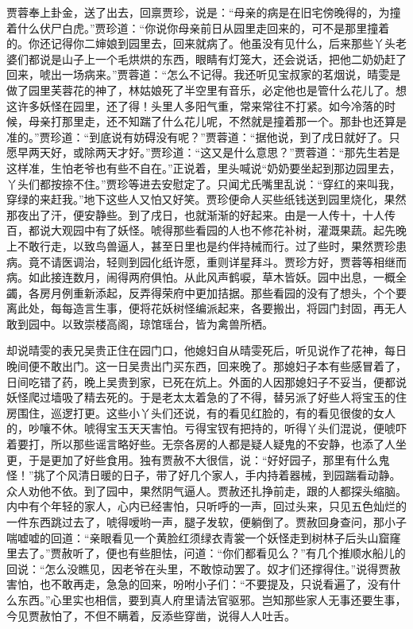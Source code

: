 \begin{parag}
    贾蓉奉上卦金，送了出去，回禀贾珍，说是：“母亲的病是在旧宅傍晚得的，为撞着什么伏尸白虎。”贾珍道：“你说你母亲前日从园里走回来的，可不是那里撞着的。你还记得你二婶娘到园里去，回来就病了。他虽没有见什么，后来那些丫头老婆们都说是山子上一个毛烘烘的东西，眼睛有灯笼大，还会说话，把他二奶奶赶了回来，唬出一场病来。”贾蓉道：“怎么不记得。我还听见宝叔家的茗烟说，晴雯是做了园里芙蓉花的神了，林姑娘死了半空里有音乐，必定他也是管什么花儿了。想这许多妖怪在园里，还了得！头里人多阳气重，常来常往不打紧。如今冷落的时候，母亲打那里走，还不知踹了什么花儿呢，不然就是撞着那一个。那卦也还算是准的。”贾珍道：“到底说有妨碍没有呢？”贾蓉道：“据他说，到了戌日就好了。只愿早两天好，或除两天才好。”贾珍道：“这又是什么意思？”贾蓉道：“那先生若是这样准，生怕老爷也有些不自在。”正说着，里头喊说“奶奶要坐起到那边园里去，丫头们都按捺不住。”贾珍等进去安慰定了。只闻尤氏嘴里乱说：“穿红的来叫我，穿绿的来赶我。”地下这些人又怕又好笑。贾珍便命人买些纸钱送到园里烧化，果然那夜出了汗，便安静些。到了戌日，也就渐渐的好起来。由是一人传十，十人传百，都说大观园中有了妖怪。唬得那些看园的人也不修花补树，灌溉果蔬。起先晚上不敢行走，以致鸟兽逼人，甚至日里也是约伴持械而行。过了些时，果然贾珍患病。竟不请医调治，轻则到园化纸许愿，重则详星拜斗。贾珍方好，贾蓉等相继而病。如此接连数月，闹得两府俱怕。从此风声鹤唳，草木皆妖。园中出息，一概全蠲，各房月例重新添起，反弄得荣府中更加拮据。那些看园的没有了想头，个个要离此处，每每造言生事，便将花妖树怪编派起来，各要搬出，将园门封固，再无人敢到园中。以致崇楼高阁，琼馆瑶台，皆为禽兽所栖。
\end{parag}


\begin{parag}
    却说晴雯的表兄吴贵正住在园门口，他媳妇自从晴雯死后，听见说作了花神，每日晚间便不敢出门。这一日吴贵出门买东西，回来晚了。那媳妇子本有些感冒着了，日间吃错了药，晚上吴贵到家，已死在炕上。外面的人因那媳妇子不妥当，便都说妖怪爬过墙吸了精去死的。于是老太太着急的了不得，替另派了好些人将宝玉的住房围住，巡逻打更。这些小丫头们还说，有的看见红脸的，有的看见很俊的女人的，吵嚷不休。唬得宝玉天天害怕。亏得宝钗有把持的，听得丫头们混说，便唬吓着要打，所以那些谣言略好些。无奈各房的人都是疑人疑鬼的不安静，也添了人坐更，于是更加了好些食用。独有贾赦不大很信，说：“好好园子，那里有什么鬼怪！”挑了个风清日暖的日子，带了好几个家人，手内持着器械，到园踹看动静。众人劝他不依。到了园中，果然阴气逼人。贾赦还扎挣前走，跟的人都探头缩脑。内中有个年轻的家人，心内已经害怕，只听呼的一声，回过头来，只见五色灿烂的一件东西跳过去了，唬得嗳哟一声，腿子发软，便躺倒了。贾赦回身查问，那小子喘嘘嘘的回道：“亲眼看见一个黄脸红须绿衣青裳一个妖怪走到树林子后头山窟窿里去了。”贾赦听了，便也有些胆怯，问道：“你们都看见么？”有几个推顺水船儿的回说：“怎么没瞧见，因老爷在头里，不敢惊动罢了。奴才们还撑得住。”说得贾赦害怕，也不敢再走，急急的回来，吩咐小子们：“不要提及，只说看遍了，没有什么东西。”心里实也相信，要到真人府里请法官驱邪。岂知那些家人无事还要生事，今见贾赦怕了，不但不瞒着，反添些穿凿，说得人人吐舌。
\end{parag}


